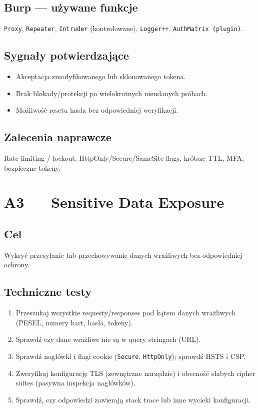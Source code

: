\documentclass[11pt,a4paper]{article}
\begin{document}
	\subsection*{Burp --- używane funkcje}
	\texttt{Proxy}, \texttt{Repeater}, \texttt{Intruder} (kontrolowane), \texttt{Logger++}, \texttt{AuthMatrix (plugin)}.
	
	\subsection*{Sygnały potwierdzające}
	\begin{itemize}
		\item Akceptacja zmodyfikowanego lub sklonowanego tokena.
		\item Brak blokady/protekcji po wielokrotnych nieudanych próbach.
		\item Możliwość resetu hasła bez odpowiedniej weryfikacji.
	\end{itemize}
	
	\subsection*{Zalecenia naprawcze}
	Rate limiting / lockout, HttpOnly/Secure/SameSite flags, krótsze TTL, MFA, bezpieczne tokeny.
	
	\newpage
	\section{A3 --- Sensitive Data Exposure}
	\subsection*{Cel}
	Wykryć przesyłanie lub przechowywanie danych wrażliwych bez odpowiedniej ochrony.
	
	\subsection*{Techniczne testy}
	\begin{enumerate}[leftmargin=*,label=\arabic*)]
		\item Przeszukaj wszystkie requesty/responses pod kątem danych wrażliwych (PESEL, numery kart, hasła, tokeny).
		\item Sprawdź czy dane wrażliwe nie są w query stringach (URL).
		\item Sprawdź nagłówki i flagi cookie (\texttt{Secure}, \texttt{HttpOnly}); sprawdź HSTS i CSP.
		\item Zweryfikuj konfigurację TLS (zewnętrzne narzędzie) i obecność słabych cipher suites (pasywna inspekcja nagłówków).
		\item Sprawdź, czy odpowiedzi zawierają stack trace lub inne wycieki konfiguracji.
	\end{enumerate}
	
\end{document}
